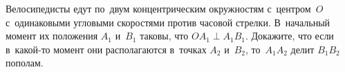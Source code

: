 \begin{problems}
\item
Велосипедисты едут по~двум концентрическим окружностям с~центром~$O$
с~одинаковыми угловыми скоростями против часовой стрелки.
В~начальный момент их положения $A_1$  и~$B_1$ таковы, что
$O A_1 \perp A_1 B_1$.
Докажите, что если в~какой-то момент они располагаются в~точках $A_2$ и~$B_2$,
то~$A_1 A_2$ делит $B_1 B_2$ пополам.

\end{problems}

